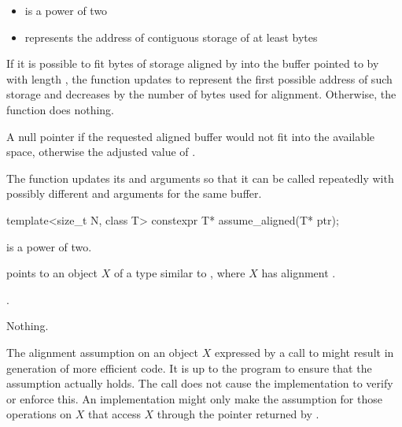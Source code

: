 \begin{itemdescr}
\pnum
\expects
\begin{itemize}
\item
{} is a power of two

\item
{} represents the address of contiguous storage of at least
 bytes
\end{itemize}

\pnum
\effects
If it is possible to fit  bytes
of storage aligned by  into the buffer pointed to by
 with length , the function updates
 to represent the first possible address of such storage
and decreases  by the number of bytes used for alignment.
Otherwise, the function does nothing.

\pnum
\returns
A null pointer if the requested aligned buffer
would not fit into the available space, otherwise the adjusted value
of .

\pnum
\begin{note}
The function updates its 
and  arguments so that it can be called repeatedly
with possibly different  and 
arguments for the same buffer.
\end{note}
\end{itemdescr}

%
\begin{itemdecl}
template<size_t N, class T>
  constexpr T* assume_aligned(T* ptr);
\end{itemdecl}

\begin{itemdescr}
\pnum
\mandates
{} is a power of two.

\pnum
\expects
{} points to an object $X$ of
a type similar to ,
where $X$ has alignment .

\pnum
\returns
{}.

\pnum
\throws
Nothing.

\pnum
\begin{note}
The alignment assumption on an object $X$
expressed by a call to 
might result in generation of more efficient code.
It is up to the program to ensure that the assumption actually holds.
The call does not cause the implementation to verify or enforce this.
An implementation might only make the assumption
for those operations on $X$ that access $X$
through the pointer returned by .
\end{note}
\end{itemdescr}

